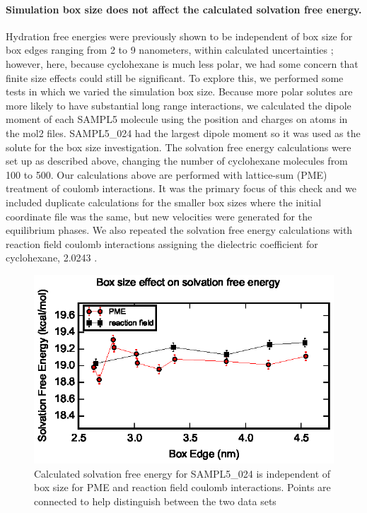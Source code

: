 \paragraph{Simulation box size does not affect the calculated solvation free energy.} 
Hydration free energies were previously shown to be independent of box size for box edges ranging from 2 to 9 nanometers, within calculated uncertainties  \cite{Parameswaran:2014kq}; however, here, because cyclohexane is much less polar, we had some concern that finite size effects could still be significant. 
To explore this, we performed some tests in which we varied the simulation box size.
Because more polar solutes are more likely to have substantial long range interactions, we calculated the dipole moment of each SAMPL5 molecule using the position and charges on atoms in the mol2 files. 
SAMPL5\_024 had the largest dipole moment so it was used as the solute for the box size investigation. 
The solvation free energy calculations were set up as described above, changing the number of cyclohexane molecules from 100 to 500.  
Our calculations above are performed with lattice-sum (PME) treatment of coulomb interactions.
It was the primary focus of this check and we included duplicate calculations for the smaller box sizes where the initial coordinate file was the same, but new velocities were generated for the equilibrium phases. 
We also repeated the solvation free energy calculations with reaction field coulomb interactions assigning the dielectric coefficient for cyclohexane, 2.0243  \cite{crc}.
\begin{figure} 
\includegraphics{boxSize.eps}
\caption{Calculated solvation free energy for SAMPL5\_024 is independent of box size for PME and reaction field coulomb interactions. Points are connected to help distinguish between the two data sets}
\label{boxSizes}  
\end{figure}
